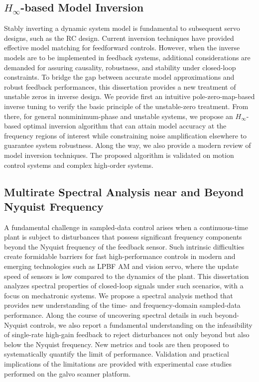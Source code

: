 \documentclass [11pt, proquest] {uwthesis}[2020/02/24]
\begin{document}
\subsection*{$H_\infty$-based Model Inversion}
Stably inverting a dynamic system model is fundamental to subsequent
servo designs, such as the RC design. Current inversion techniques have provided effective
model matching for feedforward controls. However, when the inverse
models are to be implemented in feedback systems, additional considerations
are demanded for assuring causality, robustness, and stability under
closed-loop constraints. To bridge the gap between accurate model
approximations and robust feedback performances, this dissertation provides
a new treatment of unstable zeros in inverse design. We provide first
an intuitive pole-zero-map-based inverse tuning to verify the basic
principle of the unstable-zero treatment. From there, for general
nonminimum-phase and unstable systems, we propose an $H_\infty$-based optimal inversion
algorithm that can attain model accuracy at the frequency regions
of interest while constraining noise amplification elsewhere to guarantee
system robustness. Along the way, we also provide a modern review
of model inversion techniques. The proposed algorithm is validated
on motion control systems and complex high-order systems.

\subsection*{Multirate Spectral Analysis near and Beyond Nyquist Frequency}
A fundamental challenge in sampled-data control arises when a continuous-time plant is subject to disturbances that possess significant frequency components beyond the Nyquist frequency of the feedback sensor. Such intrinsic difficulties create formidable barriers for fast high-performance controls in modern and emerging technologies such as LPBF AM and vision servo, where the update speed of sensors is low compared to the dynamics of the plant. This dissertation analyzes spectral properties of closed-loop signals under such scenarios, with a focus on mechatronic systems. We propose a spectral analysis method that provides new understanding of the time- and frequency-domain sampled-data performance. Along the course of uncovering spectral details in such beyond-Nyquist controls, we also report a fundamental understanding on the infeasibility of single-rate high-gain feedback to reject disturbances not only beyond but also below the Nyquist frequency. New metrics and tools are then proposed to systematically quantify the limit of performance. Validation and practical implications of the limitations are provided with experimental case studies performed on the galvo scanner platform.
\end{document}
